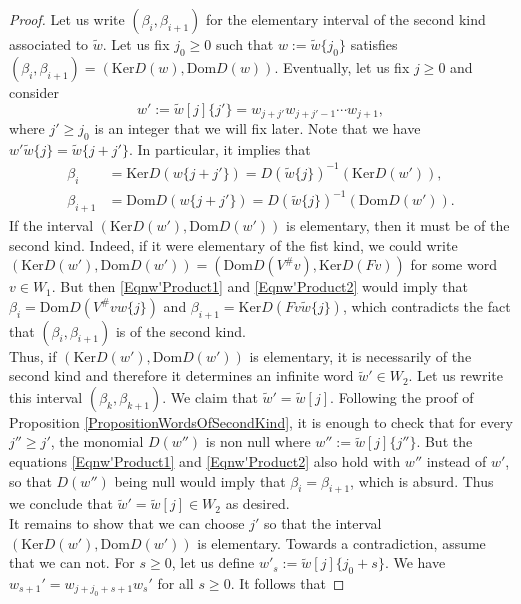 \documentclass[12pt]{amsart}
\theoremstyle{definition}
\renewcommand{\tilde}{\widetilde}
\newcommand{\<}{\langle}   %
\renewcommand{\>}{\rangle} %
\begin{document}
\begin{proof}
    Let us write $(\beta_i,\beta_{i+1})$ for the elementary interval of the second kind associated to $\tilde w$. Let us fix $j_0 \geq 0$ such that $w := \tilde w\{j_0\}$ satisfies $(\beta_i,\beta_{i+1}) = (\mathrm{Ker}D(w), \mathrm{Dom}D(w))$. Eventually, let us fix $j \geq 0$ and consider 
    \begin{equation*}
        w' := \tilde w[j]\{j'\} = w_{j+j'} w_{j+j'-1} \cdots w_{j+1},
    \end{equation*}
    where $j' \geq j_0$ is an integer that we will fix later. Note that we have $w'\tilde w\{j\} = \tilde w\{j+j'\}$. In particular, it implies that
    \begin{align}
        \label{Eqnw'Product1}\beta_i & = \mathrm{Ker}D(w\{j+j'\}) = D(\tilde w\{j\})^{-1}(\mathrm{Ker}D(w')),\\
        \label{Eqnw'Product2}\beta_{i+1} &= \mathrm{Dom}D(w\{j+j'\}) = D(\tilde w\{j\})^{-1}(\mathrm{Dom}D(w')).
    \end{align}
     If the interval $(\mathrm{Ker}D(w'), \mathrm{Dom}D(w'))$ is elementary, then it must be of the second kind. Indeed, if it were elementary of the fist kind, we could write $(\mathrm{Ker}D(w'), \mathrm{Dom}D(w')) = (\mathrm{Dom}D(V^{\#}v), \mathrm{Ker}D(Fv))$ for some word $v \in W_1$. But then \eqref{Eqnw'Product1} and \eqref{Eqnw'Product2} would imply that $\beta_i = \mathrm{Dom}D(V^{\#}vw\{j\})$ and $\beta_{i+1} = \mathrm{Ker}D(Fv\tilde w\{j\})$, which contradicts the fact that $(\beta_i,\beta_{i+1})$ is of the second kind.\\ 
     Thus, if $(\mathrm{Ker}D(w'), \mathrm{Dom}D(w'))$ is elementary, it is necessarily of the second kind and therefore it determines an infinite word $\tilde w' \in W_2$. Let us rewrite this interval $(\beta_k,\beta_{k+1})$. We claim that $\tilde w' = \tilde w[j]$. Following the proof of Proposition \ref{PropositionWordsOfSecondKind}, it is enough to check that for every $j'' \geq j'$, the monomial $D(w'')$ is non null where $w'' := \tilde w[j]\{j''\}$. But the equations \eqref{Eqnw'Product1} and \eqref{Eqnw'Product2} also hold with $w''$ instead of $w'$, so that $D(w'')$ being null would imply that $\beta_i = \beta_{i+1}$, which is absurd. Thus we conclude that $\tilde w' = \tilde w[j] \in W_2$ as desired.\\
     It remains to show that we can choose $j'$ so that the interval $(\mathrm{Ker}D(w'), \mathrm{Dom}D(w'))$ is elementary. Towards a contradiction, assume that we can not. For $s \geq 0$, let us define $w'_s := \tilde w [j]\{j_0+s\}$. We have $w_{s+1}' = w_{j+j_0+s+1}w_s'$ for all $s\geq 0$. It follows that 

\end{proof}
\end{document}
